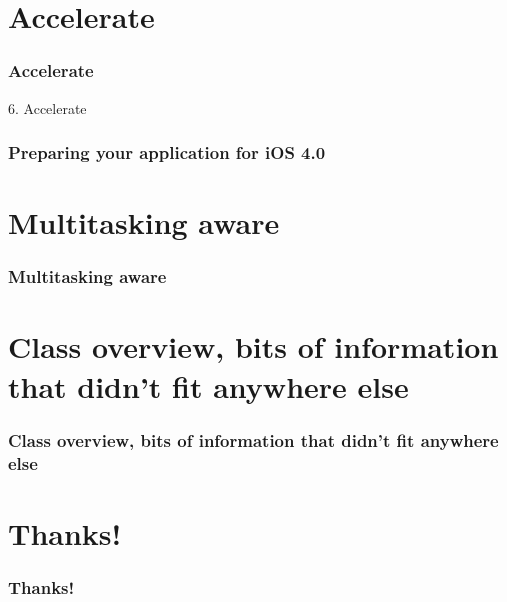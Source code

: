 \documentclass[10pt]{beamer}
\begin{document}
  

  
    
\section{Accelerate}
\begin{frame}[fragile]
  \frametitle{Accelerate}
  6. Accelerate
\end{frame}


    
\begin{frame}[fragile]
  \frametitle{Preparing your application for iOS 4.0}
  
\end{frame}

    

   
  

  
\section{Multitasking aware}
\begin{frame}[fragile]
  \frametitle{Multitasking aware}
  
\end{frame}


  

  
\section{Class overview, bits of information that didn't fit anywhere else}
\begin{frame}[fragile]
  \frametitle{Class overview, bits of information that didn't fit anywhere else}
  
\end{frame}


  

  
\section{Thanks!}
\begin{frame}[fragile]
  \frametitle{Thanks!}
  
\end{frame}


  


{}

\end{document}
